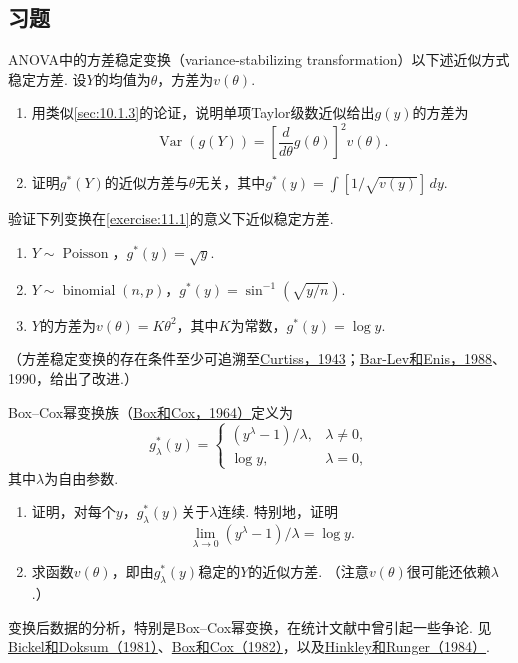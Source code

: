 \subsection{习题}\label{sec:11.4}
\begin{exercise}\label{exercise:11.1}
ANOVA中的方差稳定变换（variance-stabilizing transformation）以下述近似方式稳定方差. 设$Y$的均值为$\theta$，方差为$v(\theta)$.
\begin{enumerate}[label=(\alph*)]
\item\label{item:11.1.a} 用类似\autoref{sec:10.1.3}的论证，说明单项Taylor级数近似给出$g(y)$的方差为
$$\operatorname{Var}(g(Y))=\left[\frac d{d\theta}g(\theta)\right]^2v(\theta).$$
\item\label{item:11.1.b} 证明$g^*(Y)$的近似方差与$\theta$无关，其中$g^*(y)=\int[1/\sqrt{v(y)}]\,dy$.
\end{enumerate}
\end{exercise}

\begin{exercise}\label{exercise:11.2}
验证下列变换在\autoref{exercise:11.1}的意义下近似稳定方差.
\begin{enumerate}[label=(\alph*)]
\item\label{item:11.2.a} $Y\sim\operatorname{Poisson}$，$g^*(y)=\sqrt y$.
\item\label{item:11.2.b} $Y\sim\operatorname{binomial}(n,p)$，$g^*(y)=\sin^{-1}(\sqrt{y/n})$.
\item\label{item:11.2.c} $Y$的方差为$v(\theta)=K\theta^2$，其中$K$为常数，$g^*(y)=\log y$.
\end{enumerate}
（方差稳定变换的存在条件至少可追溯至\hyperref[bib:source90]{Curtiss，1943}；\hyperref[bib:source7]{Bar-Lev和Enis，1988}、1990，给出了改进.）
\end{exercise}

\begin{exercise}\label{exercise:11.3}
Box--Cox幂变换族（\hyperref[bib:source44]{Box和Cox，1964）}定义为
$$g_\lambda^*(y)=\begin{cases}(y^\lambda-1)/\lambda,&\lambda\ne0,\\\log y,&\lambda=0,\end{cases}$$
其中$\lambda$为自由参数.
\begin{enumerate}[label=(\alph*)]
\item\label{item:11.3.a} 证明，对每个$y$，$g_\lambda^*(y)$关于$\lambda$连续. 特别地，证明
$$\lim_{\lambda\to0}(y^\lambda-1)/\lambda=\log y.$$
\item\label{item:11.3.b} 求函数$v(\theta)$，即由$g_\lambda^*(y)$稳定的$Y$的近似方差. （注意$v(\theta)$很可能还依赖$\lambda$.）
\end{enumerate}
变换后数据的分析，特别是Box--Cox幂变换，在统计文献中曾引起一些争论. 见\hyperref[bib:source31]{Bickel和Doksum（1981）}、\hyperref[bib:source45]{Box和Cox（1982）}，以及\hyperref[bib:source168]{Hinkley和Runger（1984）}.
\end{exercise}


